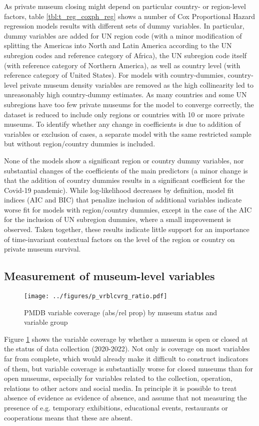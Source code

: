 \documentclass[12pt]{article}
\begin{document}
As private museum closing might depend on particular country- or region-level factors, table \ref{tbl:t_reg_coxph_reg} shows a number of Cox Proportional Hazard regression models results with different sets of dummy variables.
In particular, dummy variables are added for UN region code (with a minor modification of splitting the Americas into North and Latin America according to the UN subregion codes and reference category of Africa), the UN subregion code itself (with reference category of Northern America), as well as country level (with reference category of United States).
For models with country-dummies, country-level private museum density variables are removed as the high collinearity led to unreasonably high country-dummy estimates.
As many countries and some UN subregions have too few private museums for the model to converge correctly, the dataset is reduced to include only regions or countries with 10 or more private museums.
To identify whether any change in coefficients is due to addition of variables or exclusion of cases, a separate model with the same restricted sample but without region/country dummies is included.


None of the models show a significant region or country dummy variables, nor substantial changes of the coefficients of the main predictors (a minor change is that the addition of country dummies results in a significant coefficient for the Covid-19 pandemic).
While log-likelihood decreases by definition, model fit indices (AIC and BIC) that penalize inclusion of additional variables indicate worse fit for models with region/country dummies, except in the case of the AIC for the inclusion of UN subregion dummies, where a small improvement is observed.
Taken together, these results indicate little support for an importance of time-invariant contextual factors on the level of the region or country on private museum survival. 
\subsection*{Measurement of museum-level variables}


\begin{figure}[htbp]
\centering
\texttt{[image: ../figures/p\_vrblcvrg\_ratio.pdf]}
\caption{\label{fig:p_vrblcvrg_ratio}PMDB variable coverage (abs/rel prop) by museum status and variable group}
\end{figure}

Figure \ref{fig:p_vrblcvrg_ratio} shows the variable coverage by whether a museum is open or closed at the status of data collection (2020-2022).
Not only is coverage on most variables far from complete, which would already make it difficult to construct indicators of them, but variable coverage is substantially worse for closed museums than for open museums, especially for variables related to the collection, operation, relations to other actors and social media.
In principle it is possible to treat absence of evidence as evidence of absence, and assume that not measuring the presence of e.g. temporary exhibitions, educational events, restaurants or cooperations means that these are absent.
\end{document}
